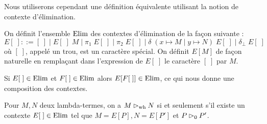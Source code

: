 Nous utiliserons cependant une définition équivalente utilisant la notion de contexte d'élimination.

\begin{defi}
    On définit l'ensemble $\mathrm{Elim}$ des contextes d'élimination de la façon suivante :
    $$E[\;] ::= [\;]\;\Big|\; E[\;]\;M\;\Big|\; \pi_1\;E[\;]\;\Big|\; \pi_2\;E[\;]\;\Big|\; \delta\;(x\mapsto M\mid y\mapsto N)\;E[\;]\;\Big|\; \delta_\bot\;E[\;]$$ où $[\;]$, appelé un trou, est un caractère spécial. On définit $E[M]$ de façon naturelle en remplaçant dans l'expression de $E[\;]$ le caractère $[\;]$ par $M$.
\end{defi}

\begin{rmk}
    Si $E[\;]\in\mathrm{Elim}$ et $F[\;]\in\mathrm{Elim}$ alors $E[F[\;]]\in\mathrm{Elim}$, ce qui nous donne une composition des contextes.
\end{rmk}

\begin{prop}
    Pour $M,N$ deux lambda-termes, on a $M\rhd_{\mathrm{wh}} N$ si et seulement s'il existe un contexte $E[\;]\in\mathrm{Elim}$ tel que $M = E[P],N = E[P']$ et $P\rhd_0 P'$.
\end{prop}

